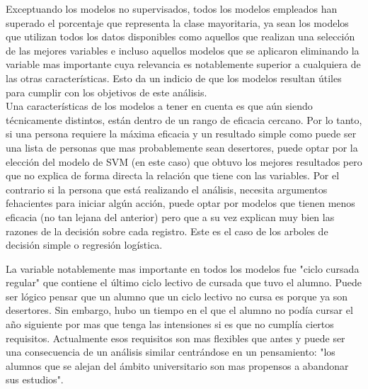 Exceptuando los modelos no supervisados, todos los modelos empleados han superado el porcentaje que representa la clase mayoritaria, ya sean los modelos que utilizan todos los datos disponibles como aquellos que realizan una selección de las mejores variables e incluso aquellos modelos que se aplicaron eliminando la variable mas importante cuya relevancia es notablemente superior a cualquiera de las otras características. Esto da un indicio de que los modelos resultan útiles para cumplir con los objetivos de este análisis.\\

Una características de los modelos a tener en cuenta es que aún siendo  técnicamente distintos, están dentro de un rango de eficacia cercano. Por lo tanto, si una persona requiere la máxima eficacia y un resultado simple como puede ser una lista de personas que mas probablemente sean desertores, puede optar por la elección del modelo de SVM (en este caso) que obtuvo los mejores resultados pero que no explica de forma directa la relación que tiene con las variables. Por el contrario si la persona que está realizando el análisis, necesita argumentos fehacientes para iniciar algún acción, puede optar por modelos que tienen menos eficacia (no tan lejana del anterior) pero que a su vez explican muy bien las razones de la decisión sobre cada registro. Este es el caso de los arboles de decisión simple o regresión logística.

La variable notablemente mas importante en todos los modelos fue "ciclo cursada regular" que contiene el último ciclo lectivo de cursada que tuvo el alumno. Puede ser lógico pensar que un alumno que un ciclo lectivo no cursa es porque ya son desertores. Sin embargo, hubo un tiempo en el que el alumno no podía cursar el año siguiente por mas que tenga las intensiones si es que no cumplía ciertos requisitos. Actualmente esos requisitos son mas flexibles que antes y puede ser una consecuencia de un análisis similar centrándose en un pensamiento: "los alumnos que se alejan del ámbito universitario son mas propensos a abandonar sus estudios".